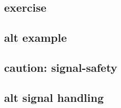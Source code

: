 \subsection{exercise}


\subsection{alt example}


\subsection{caution: signal-safety}


\subsection{alt signal handling}



